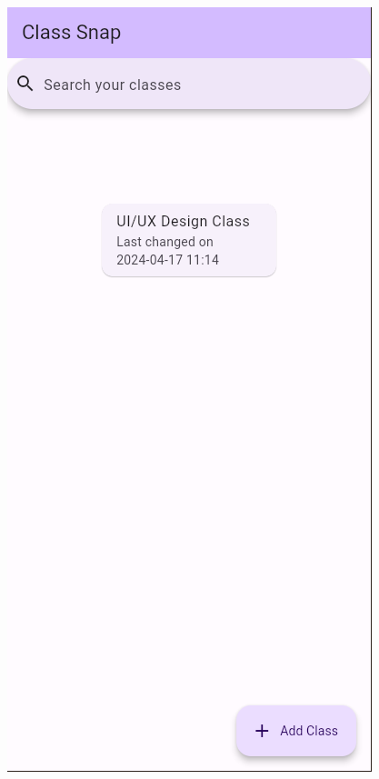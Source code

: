 \documentclass{beamer}
\begin{document}
\begin{frame}
\begin{figure}
\begin{minipage}{0.16\textwidth}
			\end{minipage}
			\hspace*{0.5cm} 
			\begin{minipage}{0.16\textwidth}
				\includegraphics[width=\linewidth]{fix_bug_naming}
			\end{minipage}
		\end{figure}
	\end{frame}
	
\end{document}
